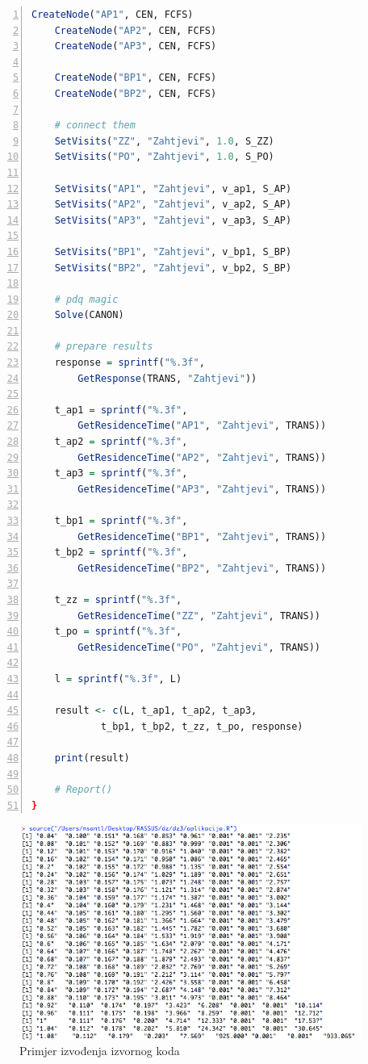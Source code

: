 \documentclass[11pt]{article}
\begin{document}
\begin{lstlisting}[caption=Izvorni kod u jeziku R, label=pdq_r, language=R, numbers=left]
	CreateNode("AP1", CEN, FCFS)
	CreateNode("AP2", CEN, FCFS)
	CreateNode("AP3", CEN, FCFS)
	
	CreateNode("BP1", CEN, FCFS)
	CreateNode("BP2", CEN, FCFS)
	
	# connect them
	SetVisits("ZZ", "Zahtjevi", 1.0, S_ZZ)
	SetVisits("PO", "Zahtjevi", 1.0, S_PO)
	
	SetVisits("AP1", "Zahtjevi", v_ap1, S_AP)
	SetVisits("AP2", "Zahtjevi", v_ap2, S_AP)
	SetVisits("AP3", "Zahtjevi", v_ap3, S_AP)	
	
	SetVisits("BP1", "Zahtjevi", v_bp1, S_BP)
	SetVisits("BP2", "Zahtjevi", v_bp2, S_BP)

	# pdq magic
	Solve(CANON)	
	
	# prepare results
	response = sprintf("%.3f", 
		GetResponse(TRANS, "Zahtjevi"))
	
	t_ap1 = sprintf("%.3f", 
		GetResidenceTime("AP1", "Zahtjevi", TRANS))
	t_ap2 = sprintf("%.3f", 
		GetResidenceTime("AP2", "Zahtjevi", TRANS))
	t_ap3 = sprintf("%.3f", 
		GetResidenceTime("AP3", "Zahtjevi", TRANS))
	
	t_bp1 = sprintf("%.3f", 
		GetResidenceTime("BP1", "Zahtjevi", TRANS))
	t_bp2 = sprintf("%.3f", 
		GetResidenceTime("BP2", "Zahtjevi", TRANS))
	
	t_zz = sprintf("%.3f", 
		GetResidenceTime("ZZ", "Zahtjevi", TRANS))
	t_po = sprintf("%.3f", 
		GetResidenceTime("PO", "Zahtjevi", TRANS))
	
	l = sprintf("%.3f", L)
	
	result <- c(L, t_ap1, t_ap2, t_ap3, 
			t_bp1, t_bp2, t_zz, t_po, response)
	
	print(result)
	
	# Report()
}
\end{lstlisting}

\newpage

\begin{figure}[h!]
	\caption{Primjer izvođenja izvornog koda}
	\centering
	\includegraphics[width=1.3\textwidth]{izvodjenje.png}
\end{figure}
\end{document}
